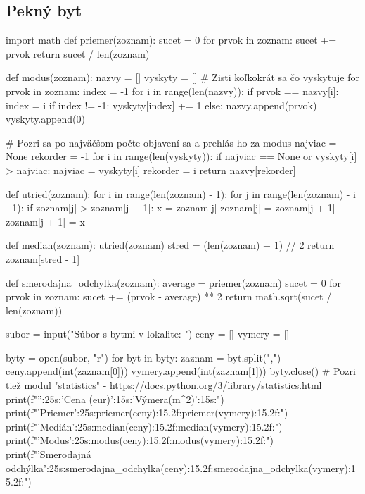 \subsection{Pekný byt}
\begin{solution}
import math
def priemer(zoznam):
    sucet = 0
    for prvok in zoznam:
        sucet += prvok
    return sucet / len(zoznam)

def modus(zoznam):
    nazvy = []
    vyskyty = []
    # Zisti koľkokrát sa čo vyskytuje
    for prvok in zoznam:
        index = -1
        for i in range(len(nazvy)):
            if prvok == nazvy[i]:
                index = i
        if index != -1:
            vyskyty[index] += 1
        else:
            nazvy.append(prvok)
            vyskyty.append(0)

    # Pozri sa po najväčšom počte objavení sa a prehlás ho za modus
    najviac = None
    rekorder = -1
    for i in range(len(vyskyty)):
        if najviac == None or vyskyty[i] > najviac:
            najviac = vyskyty[i]
            rekorder = i
    return nazvy[rekorder]

def utried(zoznam):
    for i in range(len(zoznam) - 1):
        for j in range(len(zoznam) - i - 1):
            if zoznam[j] > zoznam[j + 1]:
                x = zoznam[j]
                zoznam[j] = zoznam[j + 1]
                zoznam[j + 1] = x

def median(zoznam):
    utried(zoznam)
    stred = (len(zoznam) + 1) // 2
    return zoznam[stred - 1]

def smerodajna_odchylka(zoznam):
    average = priemer(zoznam)
    sucet = 0
    for prvok in zoznam:
        sucet += (prvok - average) ** 2
    return math.sqrt(sucet / len(zoznam))

subor = input("Súbor s bytmi v lokalite: ")
ceny = []
vymery = []

byty = open(subor, "r")
for byt in byty:
    zaznam = byt.split(",")
    ceny.append(int(zaznam[0]))
    vymery.append(int(zaznam[1]))
byty.close()
# Pozri tiež modul "statistics" - https://docs.python.org/3/library/statistics.html
print(f"{'':25s}:{'Cena (eur)':15s}:{'Výmera(m^2)':15s}:")
print(f"{'Priemer':25s}:{priemer(ceny):15.2f}:{priemer(vymery):15.2f}:")
print(f"{'Medián':25s}:{median(ceny):15.2f}:{median(vymery):15.2f}:")
print(f"{'Modus':25s}:{modus(ceny):15.2f}:{modus(vymery):15.2f}:")
print(f"{'Smerodajná odchýlka':25s}:{smerodajna_odchylka(ceny):15.2f}:{smerodajna_odchylka(vymery):15.2f}:")
\end{solution}

